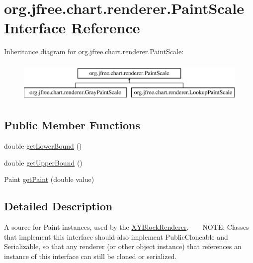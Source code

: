 \hypertarget{interfaceorg_1_1jfree_1_1chart_1_1renderer_1_1_paint_scale}{}\section{org.\+jfree.\+chart.\+renderer.\+Paint\+Scale Interface Reference}
\label{interfaceorg_1_1jfree_1_1chart_1_1renderer_1_1_paint_scale}
Inheritance diagram for org.\+jfree.\+chart.\+renderer.\+Paint\+Scale\+:\begin{figure}[H]
\begin{center}
\leavevmode
\includegraphics[height=2.000000cm]{interfaceorg_1_1jfree_1_1chart_1_1renderer_1_1_paint_scale}
\end{center}
\end{figure}
\subsection*{Public Member Functions}
\begin{DoxyCompactItemize}
\item 
double \mbox{\hyperlink{interfaceorg_1_1jfree_1_1chart_1_1renderer_1_1_paint_scale_a125f1d305abf1f3764b62f5a9c5fabbd}{get\+Lower\+Bound}} ()
\item 
double \mbox{\hyperlink{interfaceorg_1_1jfree_1_1chart_1_1renderer_1_1_paint_scale_abf6986bb5661248213645ea975828495}{get\+Upper\+Bound}} ()
\item 
Paint \mbox{\hyperlink{interfaceorg_1_1jfree_1_1chart_1_1renderer_1_1_paint_scale_a32b81d8ac78e030422937dc97526661d}{get\+Paint}} (double value)
\end{DoxyCompactItemize}


\subsection{Detailed Description}
A source for {\ttfamily Paint} instances, used by the \mbox{\hyperlink{}{X\+Y\+Block\+Renderer}}. ~\newline
~\newline
 N\+O\+TE\+: Classes that implement this interface should also implement {\ttfamily Public\+Cloneable} and {\ttfamily Serializable}, so that any renderer (or other object instance) that references an instance of this interface can still be cloned or serialized.

